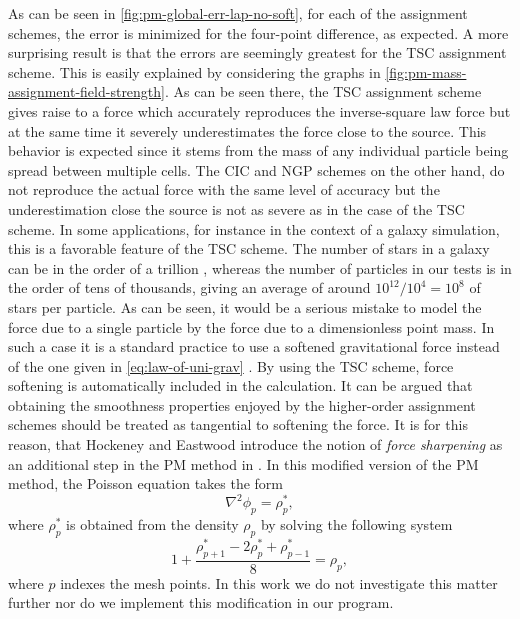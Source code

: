 As can be seen in \autoref{fig:pm-global-err-lap-no-soft}, for each of the assignment schemes, the error is minimized for the four-point difference, as expected.
A more surprising result is that the errors are seemingly greatest for the TSC assignment scheme.
This is easily explained by considering the graphs in \autoref{fig:pm-mass-assignment-field-strength}.
As can be seen there, the TSC assignment scheme gives raise to a force which accurately reproduces the inverse-square law force but at the same time it severely underestimates the force close to the source.
This behavior is expected since it stems from the mass of any individual particle being spread between multiple cells.
The CIC and NGP schemes on the other hand, do not reproduce the actual force with the same level of accuracy but the underestimation close the source is not as severe as in the case of the TSC scheme.
In some applications, for instance in the context of a galaxy simulation, this is a favorable feature of the TSC scheme.
The number of stars in a galaxy can be in the order of a trillion \cite{young2006andromeda}, whereas the number of particles in our tests is in the order of tens of thousands, giving an average of around $10^{12} / 10^{4} = 10^8$ of stars per particle.
As can be seen, it would be a serious mistake to model the force due to a single particle by the force due to a dimensionless point mass.
In such a case it is a standard practice to use a softened gravitational force instead of the one given in \autoref{eq:law-of-uni-grav} \cite{10.1046/j.1365-8711.2000.03316.x}.
By using the TSC scheme, force softening is automatically included in the calculation.
It can be argued that obtaining the smoothness properties enjoyed by the higher-order assignment schemes should be treated as tangential to softening the force.
It is for this reason, that Hockeney and Eastwood introduce the notion of \textit{force sharpening} as an additional step in the PM method in \cite{Hockney1988}.
In this modified version of the PM method, the Poisson equation takes the form
\begin{equation*}
    \nabla^2 \phi_p = \rho_p^*,
\end{equation*}
where $\rho^*_p$ is obtained from the density $\rho_p$ by solving the following system
\begin{equation*}
    1+\frac{\rho^*_{p+1} - 2\rho^*_p + \rho^*_{p-1}}{8}
    = \rho_p,
\end{equation*}
where $p$ indexes the mesh points.
In this work we do not investigate this matter further nor do we implement this modification in our program.

